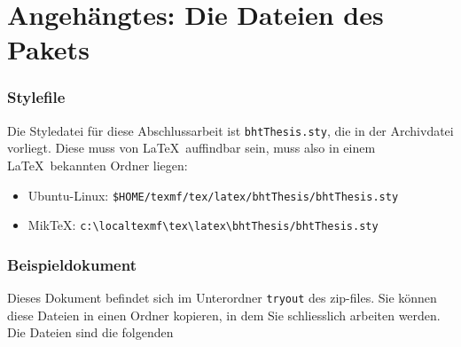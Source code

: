 

\chapter{Angehängtes: Die Dateien des Pakets}


\subsection*{Stylefile}
Die  Styledatei für diese  Abschlussarbeit ist  \texttt{bhtThesis.sty}, die  in der
Archivdatei vorliegt.  Diese muss von \LaTeX\  auffindbar sein, muss  also in einem
\LaTeX\ bekannten Ordner liegen:
\begin{itemize}
\item Ubuntu-Linux: \verb|$HOME/texmf/tex/latex/bhtThesis/bhtThesis.sty|
\item MikTeX: \verb|c:\localtexmf\tex\latex\bhtThesis/bhtThesis.sty|
\end{itemize}


\subsection*{Beispieldokument}
Dieses  Dokument befindet sich  im Unterordner  \texttt{tryout} des  zip-files. Sie
können diese  Dateien in  einen Ordner kopieren,  in dem Sie  schliesslich arbeiten
werden. Die Dateien sind die folgenden

